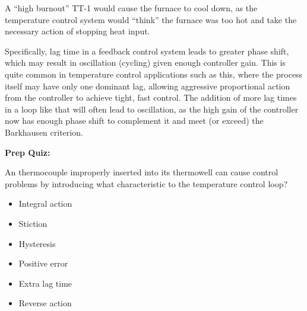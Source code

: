 





A ``high burnout'' TT-1 would cause the furnace to cool down, as the temperature control system would ``think'' the furnace was too hot and take the necessary action of stopping heat input.

\vskip 10pt

Specifically, lag time in a feedback control system leads to greater phase shift, which may result in oscillation (cycling) given enough controller gain.  This is quite common in temperature control applications such as this, where the process itself may have only one dominant lag, allowing aggressive proportional action from the controller to achieve tight, fast control.  The addition of more lag times in a loop like that will often lead to oscillation, as the high gain of the controller now has enough phase shift to complement it and meet (or exceed) the Barkhausen criterion.

\vfil \eject

\noindent
{\bf Prep Quiz:}

An thermocouple improperly inserted into its thermowell can cause control problems by introducing what characteristic to the temperature control loop?

\begin{itemize}
\item{} Integral action
\vskip 10pt
\item{} Stiction
\vskip 10pt
\item{} Hysteresis
\vskip 10pt
\item{} Positive error
\vskip 10pt
\item{} Extra lag time
\vskip 10pt
\item{} Reverse action
\end{itemize}





